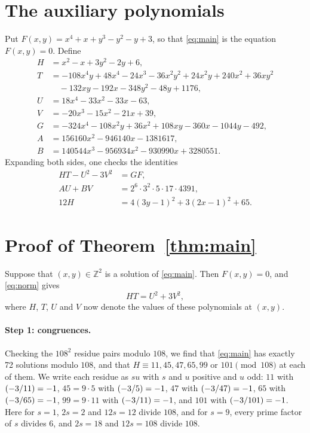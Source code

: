 \documentclass[11pt]{article}
\newcommand{\Z}{\mathbb{Z}}
\newcommand{\leg}[2]{\mathchoice{\biggl(\dfrac{#1}{#2}\biggr)}{(#1/#2)}{(#1/#2)}{(#1/#2)}}
\begin{document}
\section{The auxiliary polynomials}

Put $F(x,y)=x^{4}+x+y^{3}-y^{2}-y+3$, so that \eqref{eq:main} is the equation $F(x,y)=0$. Define
\begin{align*}
H&=x^{2}-x+3y^{2}-2y+6,\\
T&=-108x^{4}y+48x^{4}-24x^{3}-36x^{2}y^{2}+24x^{2}y+240x^{2}+36xy^{2}\\
&\quad-132xy-192x-348y^{2}-48y+1176,\\
U&=18x^{4}-33x^{2}-33x-63,\\
V&=-20x^{3}-15x^{2}-21x+39,\\
G&=-324x^{4}-108x^{2}y+36x^{2}+108xy-360x-1044y-492,\\
A&=156160x^{2}-946140x-1381617,\\
B&=140544x^{3}-956934x^{2}-930990x+3280551.
\end{align*}
Expanding both sides, one checks the identities
\begin{align}
HT-U^2-3V^2&=GF,\label{eq:norm}\\
AU+BV&=2^{6}\cdot 3^{2}\cdot 5\cdot 17\cdot 4391,\label{eq:bezout}\\
12H&=4(3y-1)^2+3(2x-1)^2+65.\label{eq:sign}
\end{align}

\section{Proof of Theorem~\ref{thm:main}}

Suppose that $(x,y)\in\Z^2$ is a solution of \eqref{eq:main}. Then $F(x,y)=0$, and \eqref{eq:norm} gives
\begin{equation}\label{eq:HT}
HT=U^2+3V^2,
\end{equation}
where $H$, $T$, $U$ and $V$ now denote the values of these polynomials at $(x,y)$.

\paragraph{Step 1: congruences.} Checking the $108^2$ residue pairs modulo $108$, we find that \eqref{eq:main} has exactly 72 solutions modulo $108$, and that $H\equiv11,\allowbreak 45,\allowbreak 47,\allowbreak 65,\allowbreak 99\text{ or }101\pmod{108}$ at each of them. We write each residue as $su$ with $s$ and $u$ positive and $u$ odd: $11$ with $\leg{-3}{11}=-1$, $45=9\cdot5$ with $\leg{-3}{5}=-1$, $47$ with $\leg{-3}{47}=-1$, $65$ with $\leg{-3}{65}=-1$, $99=9\cdot11$ with $\leg{-3}{11}=-1$, and $101$ with $\leg{-3}{101}=-1$. Here for $s=1$, $2s=2$ and $12s=12$ divide $108$, and for $s=9$, every prime factor of $s$ divides $6$, and $2s=18$ and $12s=108$ divide $108$.
\end{document}
